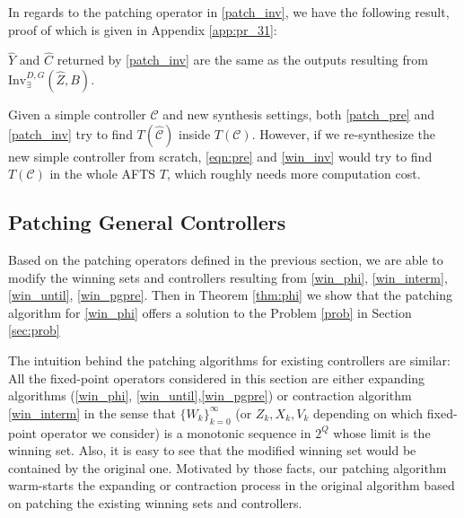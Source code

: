 In regards to the patching operator in \eqref{patch_inv}, we have the following result, proof of which is given in Appendix \ref{app:pr_31}:

\begin{theorem}
$ \widehat{Y} $ and $ \widehat{C} $ returned by \eqref{patch_inv} are the same as the outputs resulting from $ \text{Inv}_{\exists}^{D,G}(\widehat{Z},B) $.	\label{thm:inv}
\end{theorem}


Given a simple controller $ \mathcal{C} $ and new synthesis settings, both \eqref{patch_pre} and \eqref{patch_inv} try to find $ T(\widehat{\mathcal{C}}) $ inside $ T(\mathcal{C}) $. However, if we re-synthesize the new simple controller from scratch, \eqref{eqn:pre} and \eqref{win_inv} would try to find $ T(\mathcal{C}) $ in the whole AFTS $ T $, which roughly needs more computation cost.

\subsection{Patching General Controllers}


Based on the patching operators defined in the previous section, we are able to modify the winning sets and controllers resulting from \eqref{win_phi}, \eqref{win_interm}, \eqref{win_until}, \eqref{win_pgpre}. Then in Theorem \ref{thm:phi} we show that the patching algorithm for \eqref{win_phi} offers a solution to the Problem \ref{prob} in Section \ref{sec:prob}

The intuition behind the  patching algorithms for existing controllers are similar: All the fixed-point operators considered in this section are either expanding algorithms  (\eqref{win_phi}, \eqref{win_until},\eqref{win_pgpre}) or contraction algorithm \eqref{win_interm} in the sense that $ \{W_k\}_{k=0}^\infty $ (or $ Z_k, X_k,V_k $ depending on  which fixed-point operator we consider) is a monotonic sequence in $ 2^Q $ whose limit is the winning set. Also, it is easy to see that the modified winning set would be contained by the original one. Motivated by those facts, our patching algorithm warm-starts the expanding or contraction process in the original algorithm based on patching the existing winning sets and controllers.


